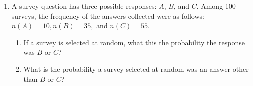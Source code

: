 \documentclass[12pt, twoside]{article}
\begin{document}
\begin{enumerate}
\newpage
\item A survey question has three possible responses: $A$, $B$, and $C$. Among 100 surveys, the frequency of the answers collected were as follows: $n(A)=10, n(B)=35, \text{ and } n(C)=55$.
\begin{enumerate}
    \item If a survey is selected at random, what this the probability the response was $B$ or $C$?  \vspace{1cm}
    \item What is the probability a survey selected at random was an answer other than $B$ or $C$?  \vspace{1cm}
\end{enumerate}

\end{enumerate}
\end{document}
